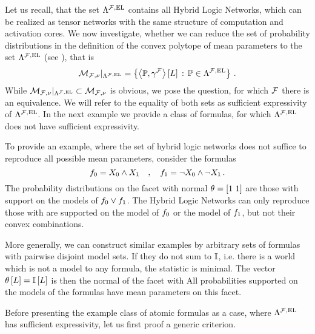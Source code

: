 Let us recall, that the set $\Lambda^{\mathcal{F},\mathrm{EL}}$ contains all Hybrid Logic Networks, which can be realized as tensor networks with the same structure of computation and activation cores.
We now investigate, whether we can reduce the set of probability distributions in the definition of the convex polytope of mean parameters to the set $\Lambda^{\mathcal{F},\mathrm{EL}}$ (see ), that is
\begin{align*}
	\mathcal{M}_{\mathcal{F},\nu}|_{\Lambda^{\mathcal{F},\mathrm{EL}}} = \left\{ \left\langle \mathbb{P},\gamma^{\mathcal{F}}\right\rangle \left[ L \right] \, : \, \mathbb{P}\in\Lambda^{\mathcal{F},\mathrm{EL}} \right\} \, .
\end{align*}
While $\mathcal{M}_{\mathcal{F},\nu}|_{\Lambda^{\mathcal{F},\mathrm{EL}}}\subset\mathcal{M}_{\mathcal{F},\nu}$ is obvious, we pose the question, for which $\mathcal{F}$ there is an equivalence.
We will refer to the equality of both sets as sufficient expressivity of $\Lambda^{\mathcal{F},\mathrm{EL}}$.
In the next example we provide a class of formulas, for which $\Lambda^{\mathcal{F},\mathrm{EL}}$ does not have sufficient expressivity.

\begin{example}\label{exa:insufficentHLNsetExpressivity}
	To provide an example, where the set of hybrid logic networks does not suffice to reproduce all possible mean parameters, consider the formulas
		\[ f_{0} = X_{0} \land X_{1} \quad, \quad f_{1} = \lnot X_{0} \land \lnot X_{1} \, . \]
	The probability distributions on the facet with normal $\theta=[1\,\, 1]$ are those with support on the models of $f_{0}\lor f_{1}$.
	The Hybrid Logic Networks can only reproduce those with are supported on the model of $f_{0}$ or the model of $f_{1}$, but not their convex combinations.
		
	More generally, we can construct similar examples by arbitrary sets of formulas with pairwise disjoint model sets.
	If they do not sum to $\mathbb{I}$, i.e. there is a world which is not a model to any formula, the statistic is minimal.
	The vector $\theta\left[L\right] = \mathbb{I}\left[L\right]$ is then the normal of the facet with 
	All probabilities supported on the models of the formulas have mean parameters on this facet.
\end{example}

Before presenting the example class of atomic formulas as a case, where $\Lambda^{\mathcal{F},\mathrm{EL}}$ has sufficient expressivity, let us first proof a generic criterion.

